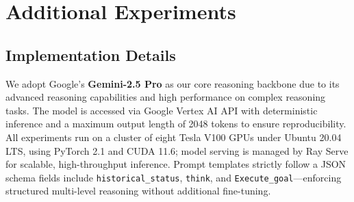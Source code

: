 \documentclass{article} %
\begin{document}
\section{Additional Experiments}
\label{sec:Additional Experiments}

\subsection{Implementation Details}
\label{sec:Implementation_Details}
We adopt Google’s \textbf{Gemini-2.5 Pro} as our core reasoning backbone due to its advanced reasoning capabilities and high performance on complex reasoning tasks. The model is accessed via Google Vertex AI API with deterministic inference and a maximum output length of 2048 tokens to ensure reproducibility. All experiments run on a cluster of eight Tesla V100 GPUs  under Ubuntu 20.04 LTS, using PyTorch 2.1 and CUDA 11.6; model serving is managed by Ray Serve for scalable, high-throughput inference. Prompt templates strictly follow a JSON schema fields include \texttt{historical\_status}, \texttt{think}, and \texttt{Execute\_goal}—enforcing structured multi-level reasoning without additional fine-tuning.
\end{document}
